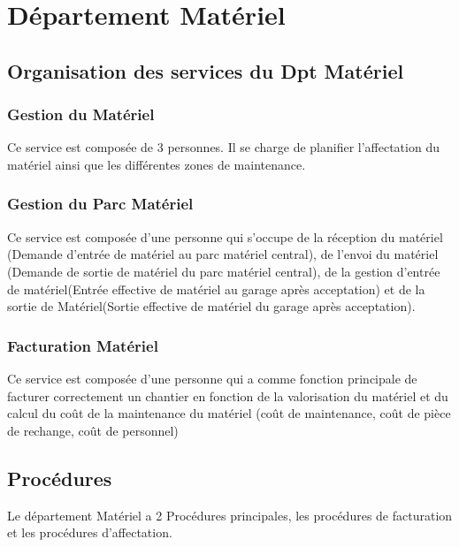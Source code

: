 \section{Département Matériel}
\subsection{Organisation des services du Dpt Matériel}


	\subsubsection{Gestion du Matériel}

	Ce service est composée de 3 personnes. Il se charge de planifier l'affectation du matériel ainsi que les différentes zones de maintenance.\\
	
	\subsubsection{Gestion du Parc Matériel}
	
	Ce service est composée d'une personne qui s'occupe de la réception du matériel (Demande d'entrée de matériel au parc matériel central), de l'envoi du matériel (Demande de sortie de matériel du parc matériel central), de la gestion d'entrée de matériel(Entrée effective de matériel au garage après acceptation) et de la sortie de Matériel(Sortie effective de matériel du garage après acceptation).
		
	\subsubsection{Facturation Matériel}
	Ce service est composée d'une personne qui a comme fonction principale de facturer correctement un chantier en fonction de la valorisation du matériel et du calcul du coût de la maintenance du matériel (coût de maintenance, coût de pièce de rechange, coût de personnel)\\
	
\subsection{Procédures}
	
Le département Matériel a 2 Procédures principales, les procédures de facturation et les procédures d'affectation.

